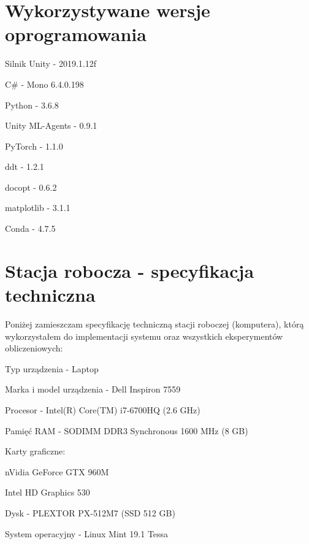 \section{Wykorzystywane wersje oprogramowania}
\begin{enumerate*}
\item Silnik Unity - 2019.1.12f
\item C\# - Mono 6.4.0.198
\item Python - 3.6.8
\item Unity ML-Agents - 0.9.1
\item PyTorch - 1.1.0
\item ddt - 1.2.1
\item docopt - 0.6.2
\item matplotlib - 3.1.1
\item Conda - 4.7.5
\end{enumerate*}

\section{Stacja robocza - specyfikacja techniczna}
Poniżej zamieszczam specyfikację techniczną stacji roboczej (komputera), którą wykorzystałem do implementacji systemu oraz wszystkich eksperymentów obliczeniowych:

\begin{enumerate*}
\item Typ urządzenia - Laptop
\item Marka i model urządzenia - Dell Inspiron 7559
\item Procesor - Intel(R) Core(TM) i7-6700HQ (2.6 GHz)
\item Pamięć RAM - SODIMM DDR3 Synchronous 1600 MHz (8 GB)
\item Karty graficzne:
\begin{itemize*}
\item nVidia GeForce GTX 960M
\item Intel HD Graphics 530
\end{itemize*}
\item Dysk - PLEXTOR PX-512M7 (SSD 512 GB)
\item System operacyjny - Linux Mint 19.1 Tessa
\end{enumerate*}